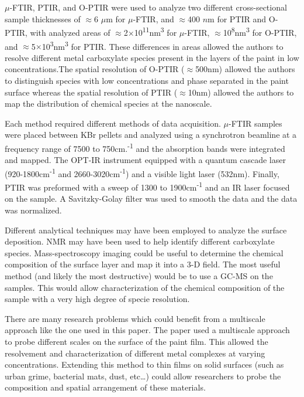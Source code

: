 \documentclass[titlepage]{article}
\begin{document}
\section{}
\setlength{\parindent}{20pt} 
\par $\mu$-FTIR, PTIR, and O-PTIR were used to analyze two different cross-sectional sample thicknesses of $\approx$6 $\mu$m for $\mu$-FTIR, and $\approx$400 $n$m for PTIR and O-PTIR, with analyzed areas of $\approx$2$\times$10\textsuperscript{11}nm\textsuperscript{3} for $\mu$-FTIR, $\approx$10\textsuperscript{8}nm\textsuperscript{3} for O-PTIR, and $\approx$5$\times$10\textsuperscript{3}nm\textsuperscript{3} for PTIR. These differences in areas allowed the authors to resolve different metal carboxylate species present in the layers of the paint in low concentrations.The spatial resolution of O-PTIR ($\approx$500nm) allowed the authors to distinguish species with low concentrations and phase separated in the paint surface whereas the spatial resolution of PTIR ($\approx$10nm) allowed the authors to map the distribution of chemical species at the nanoscale. 
\par Each method required different methods of data acquisition. $\mu$-FTIR samples were placed between KBr pellets and analyzed using  a synchrotron beamline at a frequency range of 7500 to 750cm.\textsuperscript{-1} and the absorption bands were integrated and mapped. The OPT-IR instrument equipped with a quantum cascade laser (920-1800cm\textsuperscript{-1}  and 2660-3020cm\textsuperscript{-1}) and a visible light laser (532nm). Finally, PTIR was preformed with a sweep of 1300 to 1900cm\textsuperscript{-1} and an IR laser focused on the sample. A Savitzky-Golay filter was used to smooth the data and the data was normalized. 
\par Different analytical techniques may have been employed to analyze the surface deposition. NMR may have been used to help identify different carboxylate species. Mass-spectroscopy imaging could be useful to determine the chemical composition of the surface layer and map it into a 3-D field. The most useful method (and likely the most destructive) would be to use a GC-MS on the samples. This would allow characterization of the chemical composition of the sample with a very high degree of specie resolution.
\par There are many research problems which could benefit from a multiscale approach like the one used in this paper. The paper used a multiscale approach to probe different scales on the surface of the paint film. This allowed the resolvement and characterization of different metal complexes at varying concentrations. Extending this method to thin films on solid surfaces (such as urban grime, bacterial mats, dust, etc\dots) could allow researchers to probe the composition and spatial arrangement of these materials. 
\end{document}
